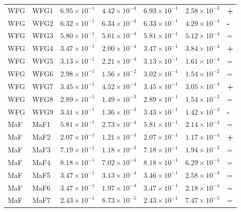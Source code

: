 \begin{table}[t]
\begin{tabular}{llrrrrl}
\addlinespace
WFG & WFG1 & $6.95\!\times\!10^{-1}$ & $4.42\!\times\!10^{-4}$ & $6.93\!\times\!10^{-1}$ & $2.58\!\times\!10^{-3}$ & \textbf{+} \\
WFG & WFG2 & $6.32\!\times\!10^{-1}$ & $6.34\!\times\!10^{-4}$ & $6.33\!\times\!10^{-1}$ & $4.29\!\times\!10^{-4}$ & \textbf{-} \\
WFG & WFG3 & $5.80\!\times\!10^{-1}$ & $5.61\!\times\!10^{-4}$ & $5.81\!\times\!10^{-1}$ & $5.12\!\times\!10^{-4}$ & = \\
WFG & WFG4 & $3.47\!\times\!10^{-1}$ & $2.00\!\times\!10^{-4}$ & $3.47\!\times\!10^{-1}$ & $3.84\!\times\!10^{-4}$ & \textbf{+} \\
WFG & WFG5 & $3.13\!\times\!10^{-1}$ & $2.21\!\times\!10^{-4}$ & $3.13\!\times\!10^{-1}$ & $1.61\!\times\!10^{-4}$ & = \\
WFG & WFG6 & $2.98\!\times\!10^{-1}$ & $1.56\!\times\!10^{-2}$ & $3.02\!\times\!10^{-1}$ & $1.54\!\times\!10^{-2}$ & = \\
WFG & WFG7 & $3.45\!\times\!10^{-1}$ & $4.52\!\times\!10^{-4}$ & $3.45\!\times\!10^{-1}$ & $3.05\!\times\!10^{-4}$ & \textbf{+} \\
WFG & WFG8 & $2.89\!\times\!10^{-1}$ & $1.49\!\times\!10^{-3}$ & $2.89\!\times\!10^{-1}$ & $1.54\!\times\!10^{-3}$ & = \\
WFG & WFG9 & $3.41\!\times\!10^{-1}$ & $1.36\!\times\!10^{-3}$ & $3.43\!\times\!10^{-1}$ & $1.42\!\times\!10^{-3}$ & \textbf{-} \\
\addlinespace
MaF & MaF1 & $5.81\!\times\!10^{-1}$ & $2.73\!\times\!10^{-4}$ & $5.81\!\times\!10^{-1}$ & $2.14\!\times\!10^{-4}$ & = \\
MaF & MaF2 & $2.07\!\times\!10^{-1}$ & $1.21\!\times\!10^{-4}$ & $2.07\!\times\!10^{-1}$ & $1.17\!\times\!10^{-4}$ & \textbf{+} \\
MaF & MaF3 & $7.19\!\times\!10^{-1}$ & $1.18\!\times\!10^{-3}$ & $7.18\!\times\!10^{-1}$ & $1.94\!\times\!10^{-3}$ & = \\
MaF & MaF4 & $8.18\!\times\!10^{-1}$ & $7.02\!\times\!10^{-4}$ & $8.18\!\times\!10^{-1}$ & $6.29\!\times\!10^{-4}$ & = \\
MaF & MaF5 & $3.47\!\times\!10^{-1}$ & $3.13\!\times\!10^{-4}$ & $3.46\!\times\!10^{-1}$ & $2.58\!\times\!10^{-4}$ & = \\
MaF & MaF6 & $3.47\!\times\!10^{-1}$ & $1.97\!\times\!10^{-4}$ & $3.47\!\times\!10^{-1}$ & $2.18\!\times\!10^{-4}$ & = \\
MaF & MaF7 & $2.43\!\times\!10^{-1}$ & $8.73\!\times\!10^{-5}$ & $2.43\!\times\!10^{-1}$ & $7.47\!\times\!10^{-5}$ & = \\
\bottomrule
\end{tabular}
\end{table}

